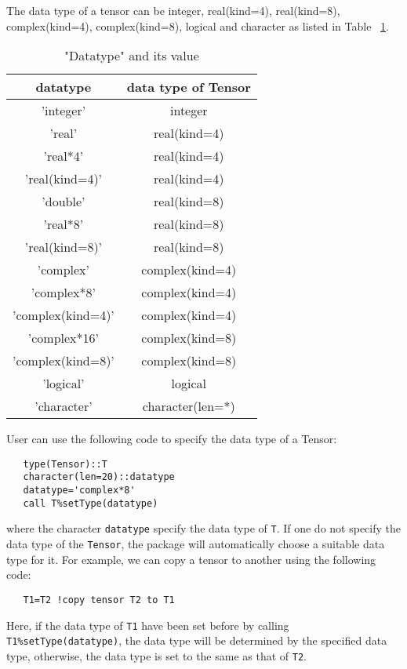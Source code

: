 \documentclass[preprint,3p,times,preprint,showpacs,amsmath,superscriptaddress,floatfix]{elsarticle}
\begin{document}
The data type of a tensor can be integer, real(kind=4), real(kind=8), complex(kind=4), complex(kind=8),
logical and character as listed in Table ~\ref{tab:datatype}.
%
\begin{table} [h]
\begin{center}
\caption{"Datatype" and its value}
\begin{tabular}{ |c |  c|}
\hline
datatype & data type of Tensor \\
\hline
\hline
'integer' & integer \\
\hline
'real' & real(kind=4) \\
\hline
'real*4' & real(kind=4) \\
\hline
'real(kind=4)' & real(kind=4) \\
\hline
'double' & real(kind=8) \\
\hline
'real*8' & real(kind=8) \\
\hline
'real(kind=8)' & real(kind=8) \\
\hline
'complex' & complex(kind=4) \\
\hline
'complex*8' & complex(kind=4) \\
\hline
'complex(kind=4)' & complex(kind=4) \\
\hline
'complex*16' & complex(kind=8) \\
\hline
'complex(kind=8)' & complex(kind=8) \\
\hline
'logical' & logical \\
\hline
'character' & character(len=*) \\
\hline
\end{tabular}
\end{center}
\label{tab:datatype}
 \end{table}
%
User can use the following code to specify the data type of a Tensor:
%
\begin{verbatim}
   type(Tensor)::T
   character(len=20)::datatype
   datatype='complex*8'
   call T%setType(datatype)
\end{verbatim}
where the character {\tt datatype} specify the data type of {\tt T}.
If one do not specify the data type of the {\tt Tensor},
the package will automatically choose a suitable data type for it.
For example, we can copy a tensor to another using the following code:
\begin{verbatim}
   T1=T2 !copy tensor T2 to T1
\end{verbatim}
%
Here, if the data type of {\tt T1} have been set before by calling {\tt T1\%setType(datatype)},
the data type will be determined by the specified data type, otherwise, the data type is set to the same as that of {\tt T2}.
\end{document}
